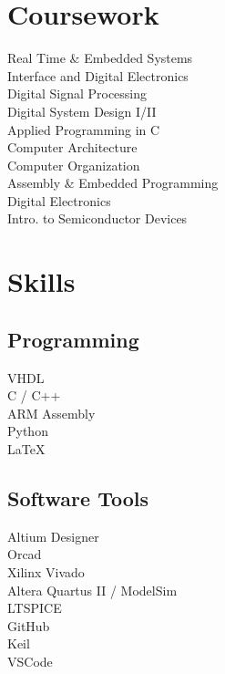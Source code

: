 \documentclass[]{deedy-resume-openfont}
\begin{document}
\begin{minipage}[t]{0.33\textwidth}

\section{Coursework}
Real Time \& Embedded Systems \\
Interface and Digital Electronics \\
Digital Signal Processing \\
Digital System Design I/II \\
Applied Programming in C \\
Computer Architecture \\
Computer Organization \\
Assembly \& Embedded Programming \\
Digital Electronics \\
Intro. to Semiconductor Devices \\
\sectionsep


\section{Skills}
\subsection{Programming}


VHDL \\ C / C++ \\ ARM Assembly \\ Python \\  
\LaTeX{} \\


\sectionsep

\subsection{Software Tools}
Altium Designer \\
Orcad \\
Xilinx Vivado \\
Altera Quartus II / ModelSim\\ 
LTSPICE\\
GitHub\\
Keil\\
VSCode\\
\sectionsep


\end{minipage}
\end{document}

